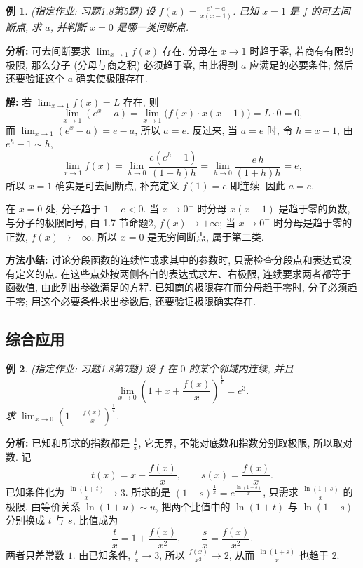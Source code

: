 \documentclass[UTF8,openany]{ctexbook}
\theoremstyle{chinesetextbook}
\newtheorem{example}{例}[section]
\newenvironment{cnsolution}{\par\indent\textbf{解:} \ignorespaces}{\par}
\begin{document}
\begin{example}
\textnormal{(指定作业: 习题1.8第5题)} 设 $\displaystyle f(x)=\frac{e^x-a}{x(x-1)}$. 已知 $x=1$ 是 $f$ 的可去间断点, 求 $a$, 并判断 $x=0$ 是哪一类间断点.
\end{example}
\par\indent\textbf{分析:} 可去间断要求 $\displaystyle\lim_{x\to1}f(x)$ 存在. 分母在 $x\to1$ 时趋于零, 若商有有限的极限, 那么分子 (分母与商之积) 必须趋于零, 由此得到 $a$ 应满足的必要条件; 然后还要验证这个 $a$ 确实使极限存在.
\begin{cnsolution}
若 $\displaystyle\lim_{x\to1}f(x)=L$ 存在, 则
\[
\lim_{x\to1}(e^x-a)=\lim_{x\to1}\bigl(f(x)\cdot x(x-1)\bigr)=L\cdot0=0,
\]
而 $\displaystyle\lim_{x\to1}(e^x-a)=e-a$, 所以 $a=e$. 反过来, 当 $a=e$ 时, 令 $h=x-1$, 由 $e^h-1\sim h$,
\[
\lim_{x\to1}f(x)=\lim_{h\to0}\frac{e(e^h-1)}{(1+h)h}=\lim_{h\to0}\frac{e\,h}{(1+h)h}=e,
\]
所以 $x=1$ 确实是可去间断点, 补充定义 $f(1)=e$ 即连续. 因此 $a=e$.

在 $x=0$ 处, 分子趋于 $1-e<0$. 当 $x\to0^+$ 时分母 $x(x-1)$ 是趋于零的负数, 与分子的极限同号, 由 1.7 节命题2, $f(x)\to+\infty$; 当 $x\to0^-$ 时分母是趋于零的正数, $f(x)\to-\infty$. 所以 $x=0$ 是无穷间断点, 属于第二类.
\end{cnsolution}
\par\indent\textbf{方法小结:} 讨论分段函数的连续性或求其中的参数时, 只需检查分段点和表达式没有定义的点. 在这些点处按两侧各自的表达式求左、右极限, 连续要求两者都等于函数值, 由此列出参数满足的方程. 已知商的极限存在而分母趋于零时, 分子必须趋于零; 用这个必要条件求出参数后, 还要验证极限确实存在.
\subsection{综合应用}
\begin{example}
\textnormal{(指定作业: 习题1.8第7题)} 设 $f$ 在 $0$ 的某个邻域内连续, 并且
\[
\lim_{x\to0}\left(1+x+\frac{f(x)}x\right)^{\frac1x}=e^3.
\]
求 $\displaystyle\lim_{x\to0}\left(1+\frac{f(x)}x\right)^{\frac1x}$.
\end{example}
\par\indent\textbf{分析:} 已知和所求的指数都是 $\displaystyle\frac1x$, 它无界, 不能对底数和指数分别取极限, 所以取对数. 记
\[
t(x)=x+\frac{f(x)}x,\qquad s(x)=\frac{f(x)}x.
\]
已知条件化为 $\displaystyle\frac{\ln(1+t)}x\to3$. 所求的是 $\displaystyle(1+s)^{\frac1x}=e^{\frac{\ln(1+s)}x}$, 只需求 $\displaystyle\frac{\ln(1+s)}x$ 的极限. 由等价关系 $\ln(1+u)\sim u$, 把两个比值中的 $\ln(1+t)$ 与 $\ln(1+s)$ 分别换成 $t$ 与 $s$, 比值成为
\[
\frac tx=1+\frac{f(x)}{x^2},\qquad\frac sx=\frac{f(x)}{x^2}.
\]
两者只差常数 $1$. 由已知条件, $\displaystyle\frac tx\to3$, 所以 $\displaystyle\frac{f(x)}{x^2}\to2$, 从而 $\displaystyle\frac{\ln(1+s)}x$ 也趋于 $2$.
\end{document}
